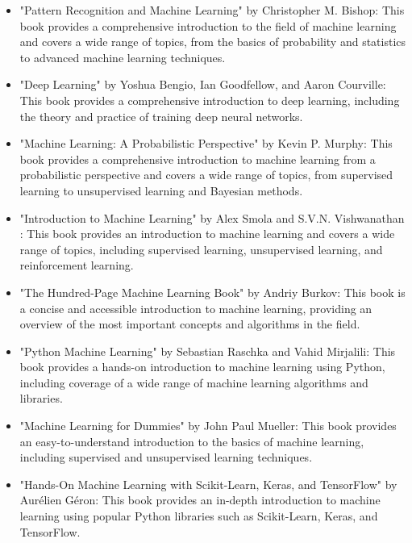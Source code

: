 \begin{itemize}
   \item "Pattern Recognition and Machine Learning" by Christopher M. Bishop: This book provides a comprehensive introduction to the field of machine learning and covers a wide range of topics, from the basics of probability and statistics to advanced machine learning techniques.

   \item "Deep Learning" by Yoshua Bengio, Ian Goodfellow, and Aaron Courville: This book provides a comprehensive introduction to deep learning, including the theory and practice of training deep neural networks.

   \item "Machine Learning: A Probabilistic Perspective" by Kevin P. Murphy: This book provides a comprehensive introduction to machine learning from a probabilistic perspective and covers a wide range of topics, from supervised learning to unsupervised learning and Bayesian methods.

   \item "Introduction to Machine Learning" by Alex Smola and S.V.N. Vishwanathan : This book provides an introduction to machine learning and covers a wide range of topics, including supervised learning, unsupervised learning, and reinforcement learning.

   \item "The Hundred-Page Machine Learning Book" by Andriy Burkov: This book is a concise and accessible introduction to machine learning, providing an overview of the most important concepts and algorithms in the field.

   \item "Python Machine Learning" by Sebastian Raschka and Vahid Mirjalili: This book provides a hands-on introduction to machine learning using Python, including coverage of a wide range of machine learning algorithms and libraries.

   \item "Machine Learning for Dummies" by John Paul Mueller: This book provides an easy-to-understand introduction to the basics of machine learning, including supervised and unsupervised learning techniques.

   \item "Hands-On Machine Learning with Scikit-Learn, Keras, and TensorFlow" by Aurélien Géron: This book provides an in-depth introduction to machine learning using popular Python libraries such as Scikit-Learn, Keras, and TensorFlow.
\end{itemize}





